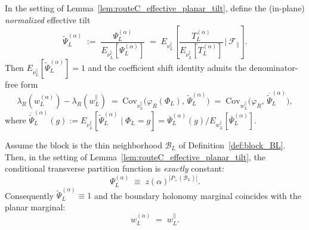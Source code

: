 \begin{corollary}\label{cor:routeC_normalized_tilt}
In the setting of Lemma~\ref{lem:routeC_effective_planar_tilt}, define the (in-plane) \emph{normalized} effective tilt
\begin{equation}\label{eq:routeC_normalized_Psi}
\widetilde\Psi_L^{(\alpha)}
\;:=\;
\frac{\Psi_L^{(\alpha)}}{E_{\nu_L^{\parallel}}[\Psi_L^{(\alpha)}]}
\;=\;
E_{\nu_L^{\parallel}}\!\left[\frac{T_L^{(\alpha)}}{E_{\nu_L^{\parallel}}[T_L^{(\alpha)}]}\,\Big|\,\mathscr F_{\parallel}\right].
\end{equation}
Then $E_{\nu_L^{\parallel}}[\widetilde\Psi_L^{(\alpha)}]=1$ and the coefficient shift identity admits the denominator-free form
\begin{equation}\label{eq:routeC_coeff_shift_Psi_normalized}
\lambda_R(w_L^{(\alpha)})-\lambda_R(w_L^{\parallel})
\;=\;\mathrm{Cov}_{\nu_L^{\parallel}}\!\big(\varphi_R(\Phi_L),\,\widetilde\Psi_L^{(\alpha)}\big)
\;=\;\mathrm{Cov}_{w_L^{\parallel}}\!\big(\varphi_R,\,\overline{\widetilde\Psi}_L^{(\alpha)}\big),
\end{equation}
where $\overline{\widetilde\Psi}_L^{(\alpha)}(g):=E_{\nu_L^{\parallel}}[\widetilde\Psi_L^{(\alpha)}\mid \Phi_L=g]=\overline\Psi_L^{(\alpha)}(g)/E_{w_L^{\parallel}}[\overline\Psi_L^{(\alpha)}]$.
\end{corollary}

\begin{lemma}\label{lem:thin_block_tilt_constant}
Assume the block is the thin neighborhood $\mathcal B_L$ of Definition~\ref{def:block_BL}.
Then, in the setting of Lemma~\ref{lem:routeC_effective_planar_tilt}, the conditional transverse partition function is \emph{exactly} constant:
\begin{equation}\label{eq:thin_block_Psi_constant}
\Psi_L^{(\alpha)}
\;\equiv\;
z(\alpha)^{|P_{\perp}(\mathcal B_L)|}.
\end{equation}
Consequently $\widetilde\Psi_L^{(\alpha)}\equiv 1$ and the boundary holonomy marginal coincides with the planar marginal:
\begin{equation}\label{eq:thin_block_w_equals_planar}
w_L^{(\alpha)} \;=\; w_L^{\parallel}.
\end{equation}
\end{lemma}

